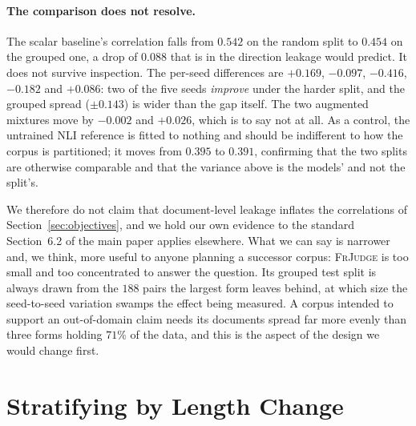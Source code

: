 \documentclass[11pt]{article}
\begin{document}
\begin{table}[t]\centering\small

\caption{Document-grouped split: no source form appears in both training and
test. Columns are as in Table~\ref{tab:models}, and the splits are size-matched
to it ($178/30/89$). The untrained NLI reference is recomputed on the grouped
splits rather than carried over, since a corpus-level correlation is not
comparable to a document-grouped one; the human ceiling is a property of the
annotations and does not depend on the split.}
\label{tab:models_grouped}
\end{table}

\paragraph{The comparison does not resolve.} The scalar baseline's correlation
falls from $0.542$ on the random split to $0.454$ on the grouped one, a drop of
$0.088$ that is in the direction leakage would predict. It does not survive
inspection. The per-seed differences are $+0.169$, $-0.097$, $-0.416$, $-0.182$
and $+0.086$: two of the five seeds \emph{improve} under the harder split, and
the grouped spread ($\pm0.143$) is wider than the gap itself. The two augmented
mixtures move by $-0.002$ and $+0.026$, which is to say not at all. As a
control, the untrained NLI reference is fitted to nothing and should be
indifferent to how the corpus is partitioned; it moves from $0.395$ to $0.391$,
confirming that the two splits are otherwise comparable and that the variance
above is the models' and not the split's.

We therefore do not claim that document-level leakage inflates the correlations
of Section~\ref{sec:objectives}, and we hold our own evidence to the standard
Section~6.2 of the main paper applies elsewhere. What we can say is narrower and, we
think, more useful to anyone planning a successor corpus: \textsc{FrJudge} is
too small and too concentrated to answer the question. Its grouped test split is
always drawn from the $188$ pairs the largest form leaves behind, at which size
the seed-to-seed variation swamps the effect being measured. A corpus intended
to support an out-of-domain claim needs its documents spread far more evenly
than three forms holding $71\%$ of the data, and this is the aspect of the
design we would change first.

\section{Stratifying by Length Change}
\label{app:buckets}
\end{document}
